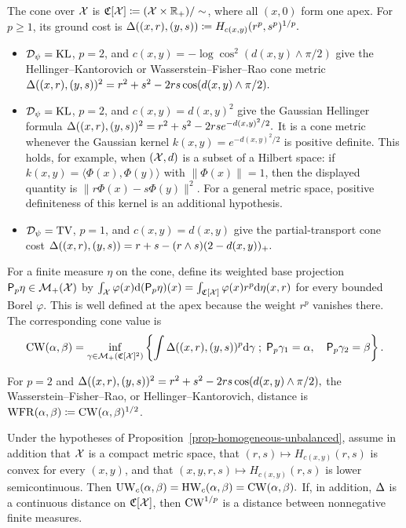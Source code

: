 \begin{defn}\label{def-unbalanced-cone-lift}
The cone over $\mathcal{X}$ is $\mathfrak C[\mathcal{X}]\coloneqq(\mathcal{X}\times\mathbb{R}_+)/\sim$, where all $(x,0)$ form one apex. For $p\geq1$, its ground cost is \(\Delta((x,r),(y,s))\coloneqq H_{c(x,y)}(r^p,s^p)^{1/p}.\)
\end{defn}
\begin{itemize}
\item $\mathcal{D}_\psi=\operatorname{KL}$, $p=2$, and $c(x,y)=-\log\cos^2(d(x,y)\wedge\pi/2)$ give the Hellinger--Kantorovich or Wasserstein--Fisher--Rao cone metric
\(\Delta((x,r),(y,s))^2=r^2+s^2-2rs\cos(d(x,y)\wedge\pi/2).\)
\item $\mathcal{D}_\psi=\operatorname{KL}$, $p=2$, and $c(x,y)=d(x,y)^2$ give the Gaussian Hellinger formula
\(\Delta((x,r),(y,s))^2=r^2+s^2-2rs e^{-d(x,y)^2/2}.\)
It is a cone metric whenever the Gaussian kernel $k(x,y)=e^{-d(x,y)^2/2}$ is positive definite. This holds, for example, when $(\mathcal{X},d)$ is a subset of a Hilbert space: if $k(x,y)=\langle\Phi(x),\Phi(y)\rangle$ with $\|\Phi(x)\|=1$, then the displayed quantity is $\|r\Phi(x)-s\Phi(y)\|^2$. For a general metric space, positive definiteness of this kernel is an additional hypothesis.
\item $\mathcal{D}_\psi=\operatorname{TV}$, $p=1$, and $c(x,y)=d(x,y)$ give the partial-transport cone cost
\(\Delta((x,r),(y,s))=r+s-(r\wedge s)(2-d(x,y))_+.\)
\end{itemize}
For a finite measure $\eta$ on the cone, define its weighted base projection $\mathsf P_p\eta\in\mathcal{M}_+(\mathcal{X})$ by \(\int_{\mathcal{X}}\varphi(x)\mathrm{d}(\mathsf P_p\eta)(x) = \int_{\mathfrak C[\mathcal{X}]}\varphi(x)r^p\mathrm{d}\eta(x,r)\)
for every bounded Borel $\varphi$. This is well defined at the apex because the weight $r^p$ vanishes there. The corresponding cone value is
\[
\operatorname{CW}(\alpha,\beta)
=
\inf_{\gamma\in\mathcal{M}_+(\mathfrak C[\mathcal{X}]^2)}
\left\{
\int \Delta((x,r),(y,s))^p\mathrm{d}\gamma
\;; \;
\mathsf P_p\gamma_1=\alpha,\quad
\mathsf P_p\gamma_2=\beta
\right\}.
\]
\begin{defn}\label{def-wfr-distance}
For $p=2$ and
\(\Delta((x,r),(y,s))^2=r^2+s^2-2rs\cos(d(x,y)\wedge\pi/2),\)
the Wasserstein--Fisher--Rao, or Hellinger--Kantorovich, distance is
$\operatorname{WFR}(\alpha,\beta)\coloneqq\operatorname{CW}(\alpha,\beta)^{1/2}$.
\end{defn}
\begin{thm}\label{thm-cone-unbalanced-ot}
Under the hypotheses of Proposition~\ref{prop-homogeneous-unbalanced}, assume in addition that $\mathcal{X}$ is a compact metric space, that $(r,s)\mapsto H_{c(x,y)}(r,s)$ is convex for every $(x,y)$, and that $(x,y,r,s)\mapsto H_{c(x,y)}(r,s)$ is lower semicontinuous. Then
\(\operatorname{UW}_c(\alpha,\beta)=\operatorname{HW}_c(\alpha,\beta)=\operatorname{CW}(\alpha,\beta).\)
If, in addition, $\Delta$ is a continuous distance on $\mathfrak C[\mathcal{X}]$, then $\operatorname{CW}^{1/p}$ is a distance between nonnegative finite measures.
\end{thm}

